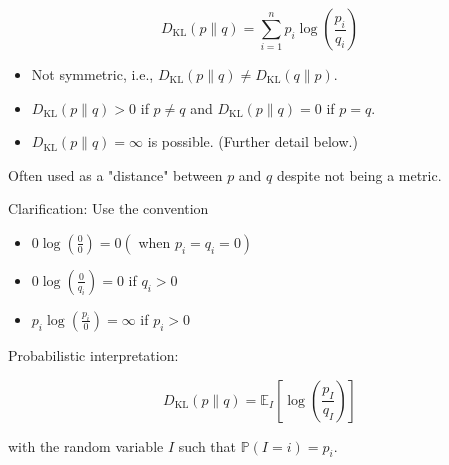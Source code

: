\begin{theorem}
    $$
    D_{\mathrm{KL}}(p \| q)=\sum_{i=1}^{n} p_{i} \log \left(\frac{p_{i}}{q_{i}}\right)
    $$

    \begin{itemize}
        \item Not symmetric, i.e., $D_{\mathrm{KL}}(p \| q) \neq D_{\mathrm{KL}}(q \| p)$.
        \item $D_{\mathrm{KL}}(p \| q)>0$ if $p \neq q$ and $D_{\mathrm{KL}}(p \| q)=0$ if $p=q$.
        \item $D_{\mathrm{KL}}(p \| q)=\infty$ is possible. (Further detail below.)
    \end{itemize}

    Often used as a "distance" between $p$ and $q$ despite not being a metric.

    \par\noindent\textcolor{gray}{\hdashrule{\textwidth}{0.4pt}{1pt 2pt}}

    Clarification: Use the convention

    \begin{itemize}
        \item $0 \log \left(\frac{0}{0}\right)=0\left(\right.$ when $\left.p_{i}=q_{i}=0\right)$
        \item $0 \log \left(\frac{0}{q_{i}}\right)=0$ if $q_{i}>0$
        \item $p_{i} \log \left(\frac{p_{i}}{0}\right)=\infty$ if $p_{i}>0$
    \end{itemize}

    \par\noindent\textcolor{gray}{\hdashrule{\textwidth}{0.4pt}{1pt 2pt}}

    Probabilistic interpretation:

    $$
    D_{\mathrm{KL}}(p \| q)=\mathbb{E}_{I}\left[\log \left(\frac{p_{I}}{q_{I}}\right)\right]
    $$

    with the random variable $I$ such that $\mathbb{P}(I=i)=p_{i}$.
\end{theorem}

